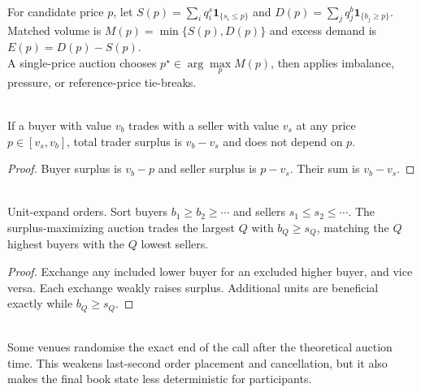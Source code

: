\documentclass[a4paper,oneside,openany]{book}
\begin{document}
\begin{model} \\
For candidate price $p$, let $S(p)=\sum\limits_i q_i^s\mathbf{1}_{\{s_i\leq p\}}$ and $D(p)=\sum\limits_j q_j^b\mathbf{1}_{\{b_j\geq p\}}$.\\
Matched volume is $M(p)=\min\{S(p),D(p)\}$ and excess demand is $E(p)=D(p)-S(p)$.\\
A single-price auction chooses $p^\star\in\arg\max\limits_{p} M(p)$, then applies imbalance, pressure, or reference-price tie-breaks.
\end{model}

\begin{lemma} \\
If a buyer with value $v_b$ trades with a seller with value $v_s$ at any price $p\in[v_s,v_b]$, total trader surplus is $v_b-v_s$ and does not depend on $p$.
\begin{proof}
Buyer surplus is $v_b-p$ and seller surplus is $p-v_s$. Their sum is $v_b-v_s$.
\end{proof}
\end{lemma}

\begin{proposition} \\
Unit-expand orders. Sort buyers $b_1\geq b_2\geq\cdots$ and sellers $s_1\leq s_2\leq\cdots$. The surplus-maximizing auction trades the largest $Q$ with $b_Q\geq s_Q$, matching the $Q$ highest buyers with the $Q$ lowest sellers.
\begin{proof}
Exchange any included lower buyer for an excluded higher buyer, and vice versa. Each exchange weakly raises surplus. Additional units are beneficial exactly while $b_Q\geq s_Q$.
\end{proof}
\end{proposition}

\begin{marketrule} \\
Some venues randomise the exact end of the call after the theoretical auction time. This weakens last-second order placement and cancellation, but it also makes the final book state less deterministic for participants.
\end{marketrule}
\end{document}

